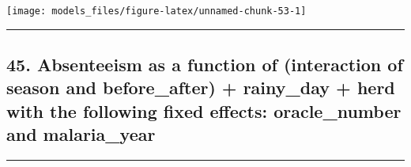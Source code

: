 \documentclass[]{article}
\begin{document}
\begin{center}\texttt{[image: models\_files/figure-latex/unnamed-chunk-53-1]} \end{center}

\newpage

\begin{center}\rule{0.5\linewidth}{\linethickness}\end{center}

\subsection{45. Absenteeism as a function of (interaction of season and
before\_after) + rainy\_day + herd with the following fixed effects:
oracle\_number and
malaria\_year}\label{absenteeism-as-a-function-of-interaction-of-season-and-before_after-rainy_day-herd-with-the-following-fixed-effects-oracle_number-and-malaria_year}

\begin{center}\rule{0.5\linewidth}{\linethickness}\end{center}
\end{document}
